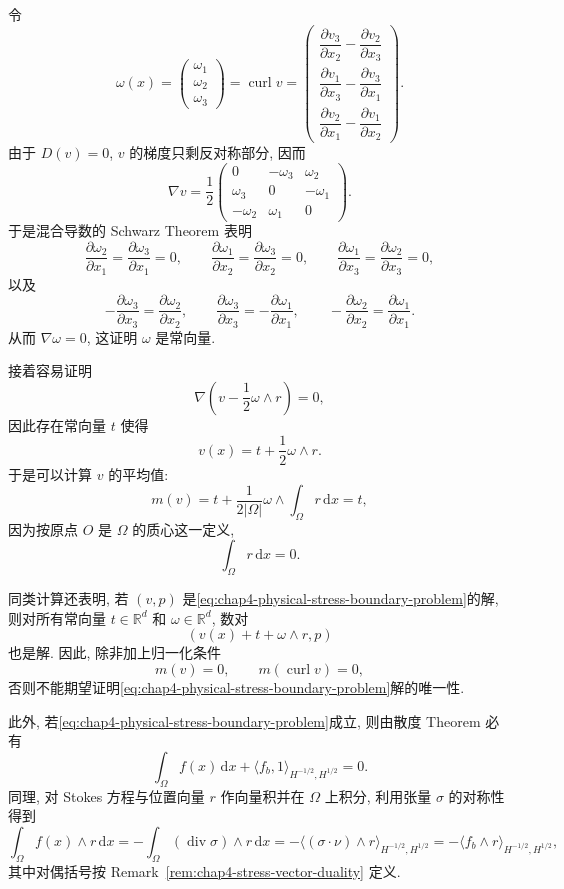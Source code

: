 \begin{Proof}
令
\[
 \omega(x)=
 \begin{pmatrix}
  \omega_1\\ \omega_2\\ \omega_3
 \end{pmatrix}
 =\operatorname{curl}v
 =\begin{pmatrix}
  \dfrac{\partial v_3}{\partial x_2}-\dfrac{\partial v_2}{\partial x_3}\\[3pt]
  \dfrac{\partial v_1}{\partial x_3}-\dfrac{\partial v_3}{\partial x_1}\\[3pt]
  \dfrac{\partial v_2}{\partial x_1}-\dfrac{\partial v_1}{\partial x_2}
 \end{pmatrix}.
\]
由于 $D(v)=0$, $v$ 的梯度只剩反对称部分, 因而
\[
 \nabla v=\frac12
 \begin{pmatrix}
  0&-\omega_3&\omega_2\\
  \omega_3&0&-\omega_1\\
  -\omega_2&\omega_1&0
 \end{pmatrix}.
\]
于是混合导数的 Schwarz Theorem 表明
\[
 \frac{\partial\omega_2}{\partial x_1}
 =\frac{\partial\omega_3}{\partial x_1}=0,
 \qquad
 \frac{\partial\omega_1}{\partial x_2}
 =\frac{\partial\omega_3}{\partial x_2}=0,
 \qquad
 \frac{\partial\omega_1}{\partial x_3}
 =\frac{\partial\omega_2}{\partial x_3}=0,
\]
以及
\[
 -\frac{\partial\omega_3}{\partial x_3}
 =\frac{\partial\omega_2}{\partial x_2},
 \qquad
 \frac{\partial\omega_3}{\partial x_3}
 =-\frac{\partial\omega_1}{\partial x_1},
 \qquad
 -\frac{\partial\omega_2}{\partial x_2}
 =\frac{\partial\omega_1}{\partial x_1}.
\]
从而 $\nabla\omega=0$, 这证明 $\omega$ 是常向量.

接着容易证明
\[
 \nabla\left(v-\frac12\omega\wedge r\right)=0,
\]
因此存在常向量 $t$ 使得
\[
 v(x)=t+\frac12\omega\wedge r.
\]
于是可以计算 $v$ 的平均值:
\[
 m(v)=t+\frac1{2|\Omega|}\omega\wedge\int_\Omega r\,\mathrm dx=t,
\]
因为按原点 $O$ 是 $\Omega$ 的质心这一定义,
\[
 \int_\Omega r\,\mathrm dx=0.
\]
\end{Proof}

同类计算还表明, 若 $(v,p)$ 是\eqref{eq:chap4-physical-stress-boundary-problem}的解, 则对所有常向量 $t\in\mathbb R^d$ 和 $\omega\in\mathbb R^d$, 数对
\[
 (v(x)+t+\omega\wedge r,p)
\]
也是解. 因此, 除非加上归一化条件
\[
 m(v)=0,
 \qquad
 m(\operatorname{curl}v)=0,
\]
否则不能期望证明\eqref{eq:chap4-physical-stress-boundary-problem}解的唯一性.

此外, 若\eqref{eq:chap4-physical-stress-boundary-problem}成立, 则由散度 Theorem 必有
\[
 \int_\Omega f(x)\,\mathrm dx
 +\langle f_b,1\rangle_{H^{-1/2},H^{1/2}}=0.
\]
同理, 对 Stokes 方程与位置向量 $r$ 作向量积并在 $\Omega$ 上积分, 利用张量 $\sigma$ 的对称性得到
\[
 \int_\Omega f(x)\wedge r\,\mathrm dx
 =-\int_\Omega(\operatorname{div}\sigma)\wedge r\,\mathrm dx
 =-\langle(\sigma\cdot\nu)\wedge r\rangle_{H^{-1/2},H^{1/2}}
 =-\langle f_b\wedge r\rangle_{H^{-1/2},H^{1/2}},
\]
其中对偶括号按 Remark~\ref{rem:chap4-stress-vector-duality} 定义.


